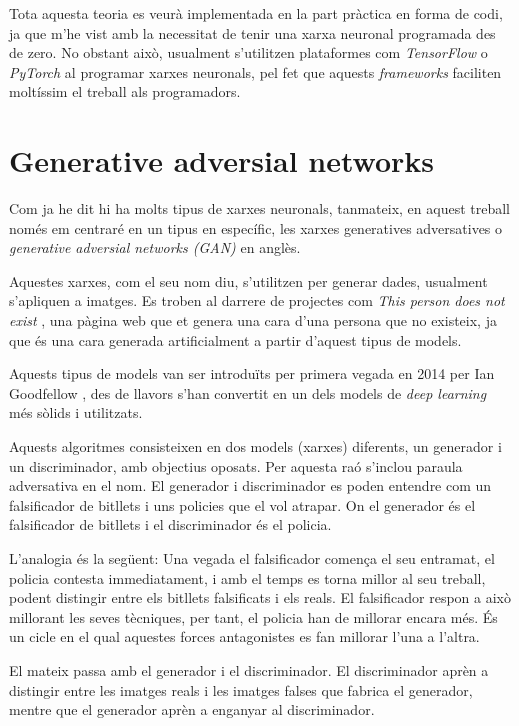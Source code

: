 Tota aquesta teoria es veurà implementada en la part pràctica en forma de codi, ja que m'he vist amb la necessitat de tenir una xarxa neuronal programada des de zero. No obstant això, usualment s'utilitzen plataformes com \textit{TensorFlow} \cite{tensorflow2015-whitepaper} o \textit{PyTorch} \cite{pytorch_2019} al programar xarxes neuronals, pel fet que aquests \textit{frameworks} faciliten moltíssim el treball als programadors.

\section{Generative adversial networks}
Com ja he dit hi ha molts tipus de xarxes neuronals, tanmateix, en aquest treball només em centraré en un tipus en específic, les xarxes generatives adversatives o \textit{generative adversial networks (GAN)} en anglès.

Aquestes xarxes, com el seu nom diu, s'utilitzen per generar dades, usualment s'apliquen a imatges. Es troben al darrere de projectes com \textit{This person does not exist} \cite{styleGAN, this_person_does_not_exist}, una pàgina web que et genera una cara d'una persona que no existeix, ja que és una cara generada artificialment a partir d'aquest tipus de models.

Aquests tipus de models van ser introduïts per primera vegada en 2014 per Ian Goodfellow \cite{GAN2014}, des de llavors s'han convertit en un dels models de \textit{deep learning} més sòlids i utilitzats.

Aquests algoritmes consisteixen en dos models (xarxes) diferents, un generador i un discriminador, amb objectius oposats. Per aquesta raó s'inclou paraula adversativa en el nom. El generador i discriminador es poden entendre com un falsificador de bitllets i uns policies que el vol atrapar. On el generador és el falsificador de bitllets i el discriminador és el policia.

L'analogia és la següent: 
Una vegada el falsificador comença el seu entramat, el policia contesta immediatament, i amb el temps es torna millor al seu treball, podent distingir entre els bitllets falsificats i els reals. El falsificador respon a això millorant les seves tècniques, per tant, el policia han de millorar encara més. És un cicle en el qual aquestes forces antagonistes es fan millorar l'una a l'altra.

El mateix passa amb el generador i el discriminador. El discriminador aprèn a distingir entre les imatges reals i les imatges falses que fabrica el generador, mentre que el generador aprèn a enganyar al discriminador. 

